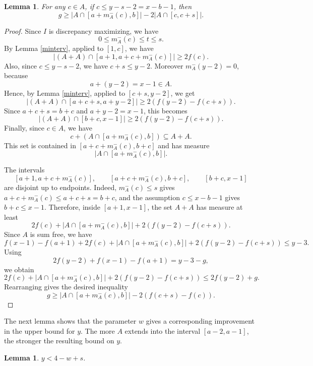 \documentclass[11pt,reqno]{amsart}
\newtheorem{lem}[thm]{Lemma}
\theoremstyle{definition}
\def\F#1{f(#1)}
\begin{document}
\begin{lem} \label{c lem}
    For any $c\in A$, if $c\leq y - s - 2 = x - b - 1$, then
    \begin{equation*}
        g\geq |A\cap [a + m_A^-(c), b]| - 2|A\cap [c, c + s]|. 
    \end{equation*}
\end{lem}

\begin{proof}
    Since $I$ is discrepancy maximizing, we have
    $$
        0\leq m_A^-(c)\leq t\leq s.
    $$
    By Lemma \ref{minterv}, applied to $[1,c]$, we have
    $$
        |(A+A)\cap [a+1,a+c+m_A^-(c)]|\geq 2\F{c}.
    $$
    Also, since $c\leq y-s-2$, we have $c+s\leq y-2$. Moreover
    $m_A^-(y-2)=0$, because
    $$
        a+(y-2)=x-1\in A.
    $$
    Hence, by Lemma \ref{minterv}, applied to
    $[c+s,y-2]$, we get
    $$
        |(A+A)\cap [a+c+s,a+y-2]|
        \geq 2(\F{y-2}-\F{c+s}).
    $$
     Since $a+c+s=b+c$ and $a+y-2=x-1$, this becomes
    $$
        |(A+A)\cap [b+c,x-1]|
        \geq 2(\F{y-2}-\F{c+s}).
    $$
    Finally, since $c\in A$, we have
    $$
        c+(A\cap [a+m_A^-(c),b])\subseteq A+A.
    $$
    This set is contained in $[a+c+m_A^-(c),b+c]$ and has measure
    $$
        |A\cap [a+m_A^-(c),b]|.
    $$

    The intervals
    $$
        [a+1,a+c+m_A^-(c)],\qquad
        [a+c+m_A^-(c),b+c],\qquad
        [b+c,x-1]
    $$
    are disjoint up to endpoints. Indeed, $m_A^-(c)\leq s$ gives
    $a+c+m_A^-(c)\leq a+c+s=b+c$, and the assumption
    $c\leq x-b-1$ gives $b+c\leq x-1$.
    Therefore, inside $[a+1,x-1]$, the set $A+A$ has measure at least
    $$
        2\F{c}
        +|A\cap [a+m_A^-(c),b]|
        +2(\F{y-2}-\F{c+s}).
    $$
    Since $A$ is sum free, we have
    $$
        \F{x-1}-\F{a+1}
        +2\F{c}
        +|A\cap [a+m_A^-(c),b]|
        +2(\F{y-2}-\F{c+s})
        \leq y-3.
    $$
    Using
    $$
        2\F{y-2}+\F{x-1}-\F{a+1}=y-3-g,
    $$
    we obtain
    $$
        2\F{c}
        +|A\cap [a+m_A^-(c),b]|
        +2(\F{y-2}-\F{c+s})
        \leq 2\F{y-2}+g.
    $$
    Rearranging gives the desired inequality
    $$
        g\geq |A\cap [a+m_A^-(c),b]|-2(\F{c+s}-\F{c}).
    $$
\end{proof}

The next lemma shows that the parameter $w$ gives a corresponding improvement in the upper bound for $y$. The more $A$ extends into the interval $[a-2,a-1]$, the stronger the resulting bound on $y$.
\begin{lem}
    $y < 4 - w + s$. 
\end{lem}
\end{document}
